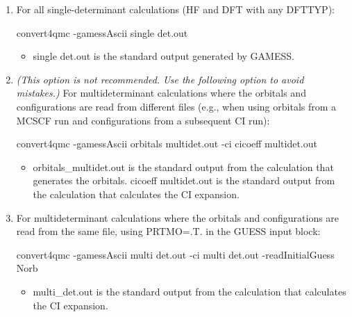 \begin{enumerate}
  \item{For all single-determinant calculations (HF and DFT with any DFTTYP):}
  \begin{shade}
convert4qmc -gamessAscii single det.out
  \end{shade}
  \begin{itemize}
    \item{single det.out is the standard output generated by GAMESS.}
  \end{itemize}
  \item{\textit{(This option is not recommended. Use the following option to avoid mistakes.)} For 
    multideterminant calculations where the orbitals and configurations are read from different
    files (e.g., when using orbitals from a MCSCF run and configurations from a
    subsequent CI run):}
  \begin{shade}
convert4qmc -gamessAscii orbitals multidet.out -ci cicoeff multidet.out
  \end{shade}
  \begin{itemize}
    \item{orbitals\_multidet.out is the standard output from the calculation that generates the
       orbitals. cicoeff multidet.out is the standard output from the calculation that calculates 
       the CI expansion.}
  \end{itemize}
  \item{For multideterminant calculations where the orbitals and configurations are read from
    the same file, using PRTMO=.T. in the GUESS input block:}
  \begin{shade}
convert4qmc -gamessAscii multi det.out -ci multi det.out -readInitialGuess Norb
  \end{shade}
  \begin{itemize}
    \item{multi\_det.out is the standard output from the calculation that calculates the CI expansion.}
  \end{itemize}
\end{enumerate}

